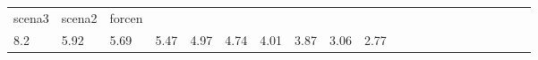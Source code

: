 \begin{table}
\begin{center}
\begin{tabular}{lllllllllllllllllllll}
    scena3
    
    
    &
    
    scena2
    
    
    &
    
    forcen
     \\

    
    
    8.2
    
    
    &
    
    5.92
    
    
    &
    
    5.69
    
    
    &
    
    5.47
    
    
    &
    
    4.97
    
    
    &
    
    4.74
    
    
    &
    
    4.01
    
    
    &
    
    3.87
    
    
    &
    
    3.06
    
    
    &
    
    2.77
    
    
    &
    
    
     \\



\end{tabular}
\end{center}
\label{T:offmetrics}
\end{table}